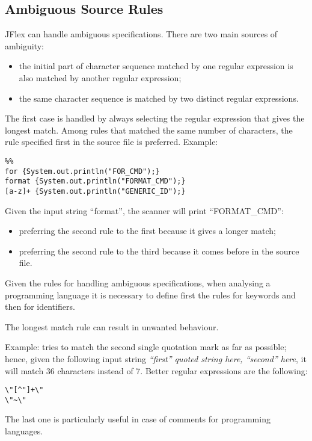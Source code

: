 \subsection{Ambiguous Source Rules}
JFlex can handle ambiguous specifications.
There are two main sources of ambiguity:
\begin{itemize}
    \item the initial part of character sequence matched by one regular expression is also matched by another regular expression;
    \item the same character sequence is matched by two distinct regular expressions.
\end{itemize}
The first case is handled by always selecting the regular expression that gives the longest match.
Among rules that matched the same number of characters, the rule specified first in the source file is preferred.
Example:
\begin{lstlisting}[frame=single]
%%
%%
for {System.out.println("FOR_CMD");}
format {System.out.println("FORMAT_CMD");}
[a-z]+ {System.out.println("GENERIC_ID");}
\end{lstlisting}
Given the input string ``format'', the scanner will print ``FORMAT\_CMD'':
\begin{itemize}
    \item preferring the second rule to the first because it gives a longer match;
    \item preferring the second rule to the third because it comes before in the source file.
\end{itemize}

Given the rules for handling ambiguous specifications, when analysing a programming language it is necessary to define first the rules for keywords and then for identifiers.

The longest match rule can result in unwanted behaviour.

Example:  tries to match the second single quotation mark as far as possible; hence, given the following input string \emph{``first'' quoted string here, ``second'' here}, it will match 36 characters instead of 7.
Better regular expressions are the following:
\begin{lstlisting}
\"[^"]+\"
\"~\"
\end{lstlisting}
The last one is particularly useful in case of comments for programming languages.

